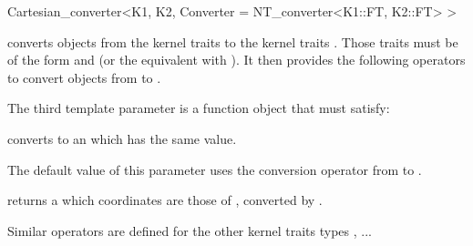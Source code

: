 \begin{ccRefClass}{Cartesian_converter<K1, K2,
                             Converter = NT_converter<K1::FT, K2::FT> >}

\KernelRefLayout\gdef\ccTagOperatorLayout{\ccFalse}

\ccDefinition

\ccClassTemplateName converts objects from the kernel traits  to
the kernel traits .  Those traits must be of the form
 and  (or the equivalent with
).  It then provides the following operators to convert
objects from  to .


\ccTypes

The third template parameter  is a function object that must
satisfy:

{ converts  to an  which has the same value.}

The default value of this parameter uses the conversion operator from
 to .

\ccCreation
{}


\ccOperations

{ returns a  which coordinates are those of ,
converted by .}

Similar operators are defined for the other kernel traits types ,
...


\end{ccRefClass}

